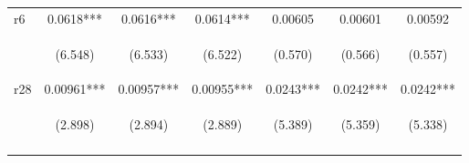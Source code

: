\documentclass[]{article}
\begin{document}
\begin{center}
\begin{tabular}{lcccccc}
r6 & 0.0618*** & 0.0616*** & 0.0614*** & 0.00605 & 0.00601 & 0.00592 \\
\vspace{4pt} & \begin{footnotesize}(6.548)\end{footnotesize} & \begin{footnotesize}(6.533)\end{footnotesize} & \begin{footnotesize}(6.522)\end{footnotesize} & \begin{footnotesize}(0.570)\end{footnotesize} & \begin{footnotesize}(0.566)\end{footnotesize} & \begin{footnotesize}(0.557)\end{footnotesize} \\
r28 & 0.00961*** & 0.00957*** & 0.00955*** & 0.0243*** & 0.0242*** & 0.0242*** \\
 & \begin{footnotesize}(2.898)\end{footnotesize} & \begin{footnotesize}(2.894)\end{footnotesize} & \begin{footnotesize}(2.889)\end{footnotesize} & \begin{footnotesize}(5.389)\end{footnotesize} & \begin{footnotesize}(5.359)\end{footnotesize} & \begin{footnotesize}(5.338)\end{footnotesize} \\
\vspace{4pt} & \begin{footnotesize}\end{footnotesize} & \begin{footnotesize}\end{footnotesize} & \begin{footnotesize}\end{footnotesize} & \begin{footnotesize}\end{footnotesize} & \begin{footnotesize}\end{footnotesize} & \begin{footnotesize}\end{footnotesize} \\

\end{tabular}
\end{center}
\end{document}
